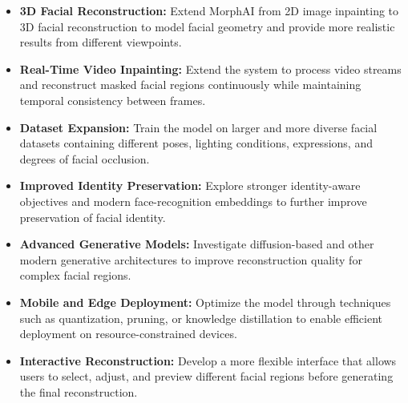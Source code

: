 \begin{itemize}
    \item \textbf{3D Facial Reconstruction:} Extend MorphAI from 2D image
    inpainting to 3D facial reconstruction to model facial geometry and
    provide more realistic results from different viewpoints.
    
    \item \textbf{Real-Time Video Inpainting:} Extend the system to process
    video streams and reconstruct masked facial regions continuously while
    maintaining temporal consistency between frames.
    
    \item \textbf{Dataset Expansion:} Train the model on larger and more
    diverse facial datasets containing different poses, lighting
    conditions, expressions, and degrees of facial occlusion.
    
    \item \textbf{Improved Identity Preservation:} Explore stronger
    identity-aware objectives and modern face-recognition embeddings to
    further improve preservation of facial identity.
    
    \item \textbf{Advanced Generative Models:} Investigate diffusion-based
    and other modern generative architectures to improve reconstruction
    quality for complex facial regions.
    
    \item \textbf{Mobile and Edge Deployment:} Optimize the model through
    techniques such as quantization, pruning, or knowledge distillation
    to enable efficient deployment on resource-constrained devices.
    
    \item \textbf{Interactive Reconstruction:} Develop a more flexible
    interface that allows users to select, adjust, and preview different
    facial regions before generating the final reconstruction.
\end{itemize}